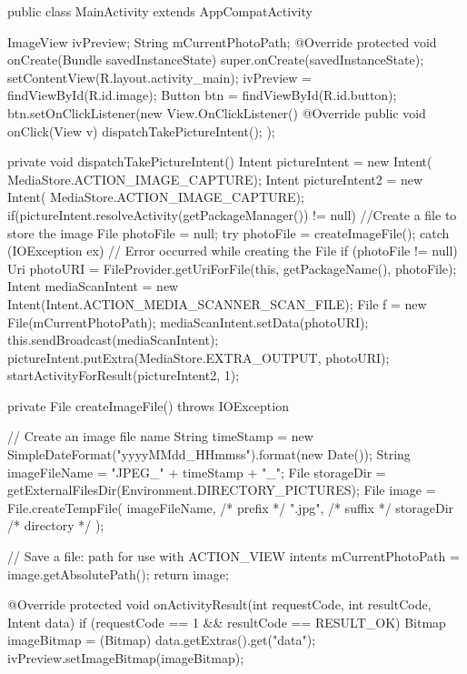 \documentclass[a4paper,12pt]{article}
\begin{document}
\begin{MyCode}
	
	public class MainActivity extends AppCompatActivity {	
		ImageView ivPreview;
		String mCurrentPhotoPath;
		@Override
		protected void onCreate(Bundle savedInstanceState) {
			super.onCreate(savedInstanceState);
			setContentView(R.layout.activity_main);
			ivPreview = findViewById(R.id.image);
			Button btn = findViewById(R.id.button);
			btn.setOnClickListener(new View.OnClickListener() {
				@Override
				public void onClick(View v) {
					dispatchTakePictureIntent();
				}
			});
		}
		
		private void dispatchTakePictureIntent() {
			Intent pictureIntent = new Intent(
			MediaStore.ACTION_IMAGE_CAPTURE);
			Intent pictureIntent2 = new Intent(
			MediaStore.ACTION_IMAGE_CAPTURE);
			if(pictureIntent.resolveActivity(getPackageManager()) != null){
				//Create a file to store the image
				File photoFile = null;
				try {
					photoFile = createImageFile();
				} catch (IOException ex) {
					// Error occurred while creating the File		
				}
				if (photoFile != null) {
					Uri photoURI = FileProvider.getUriForFile(this, getPackageName(), photoFile);
					Intent mediaScanIntent = new Intent(Intent.ACTION_MEDIA_SCANNER_SCAN_FILE);
					File f = new File(mCurrentPhotoPath);
					mediaScanIntent.setData(photoURI);
					this.sendBroadcast(mediaScanIntent);
					pictureIntent.putExtra(MediaStore.EXTRA_OUTPUT,
					photoURI);
					startActivityForResult(pictureIntent2,
					1);
				}
			}
		}
		
		private File createImageFile() throws IOException {
			// Create an image file name
			String timeStamp = new SimpleDateFormat("yyyyMMdd_HHmmss").format(new Date());
			String imageFileName = "JPEG_" + timeStamp + "_";
			File storageDir = getExternalFilesDir(Environment.DIRECTORY_PICTURES);
			File image = File.createTempFile(
			imageFileName,  /* prefix */
			".jpg",         /* suffix */
			storageDir      /* directory */
			);
			
			// Save a file: path for use with ACTION_VIEW intents
			mCurrentPhotoPath = image.getAbsolutePath();
			return image;
		}
		
		@Override
		protected void onActivityResult(int requestCode, int resultCode, Intent data) {
			if (requestCode == 1 && resultCode == RESULT_OK) {
				Bitmap imageBitmap = (Bitmap) data.getExtras().get("data");
				ivPreview.setImageBitmap(imageBitmap);
			}
		}
	}
\end{MyCode}
\end{document}
